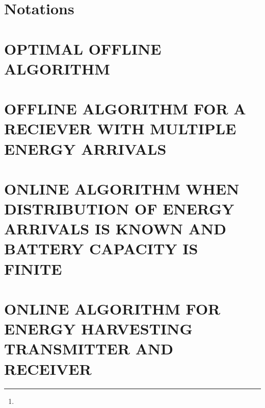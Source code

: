 \documentclass[10pt,twocolumn,twoside]{IEEEtran}
\title{}
\author{
\thanks{}
}
\begin{document}
\maketitle
\thispagestyle{empty}
\pagestyle{empty}
\begin{abstract}
\end{abstract}


\begin{IEEEkeywords}
\end{IEEEkeywords}

\section{Notations}


\section{OPTIMAL OFFLINE ALGORITHM}


\section{OFFLINE ALGORITHM FOR A RECIEVER WITH MULTIPLE ENERGY ARRIVALS}


\section{ONLINE ALGORITHM WHEN DISTRIBUTION OF ENERGY ARRIVALS IS KNOWN AND BATTERY CAPACITY IS FINITE}


\section{ONLINE ALGORITHM FOR ENERGY HARVESTING TRANSMITTER AND RECEIVER}


\appendices


 
\end{document}
